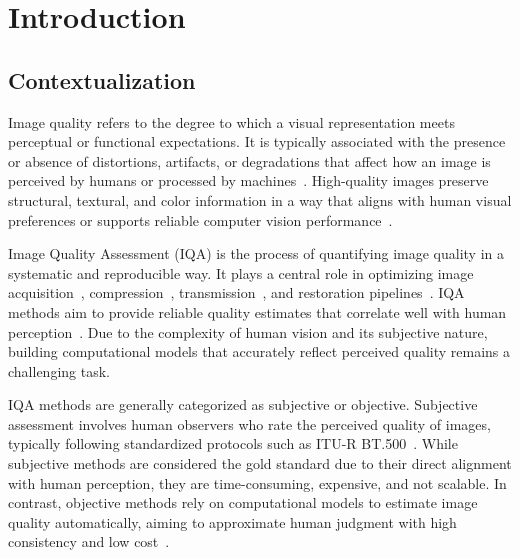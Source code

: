 \chapter{Introduction}\label{chap:introduction}

\section{Contextualization}\label{sec:contextualization}

Image quality refers to the degree to which a visual representation meets perceptual or functional expectations. It is typically associated with the presence or absence of distortions, artifacts, or degradations that affect how an image is perceived by humans or processed by machines~\cite{wang_bovik_modern_iqa_2006, thung_survey_iqa, ComprehensiveEvaluation2019}. High-quality images preserve structural, textural, and color information in a way that aligns with human visual preferences or supports reliable computer vision performance~\cite{sheikh_vif_2006, zhang_lpips_2018}.

Image Quality Assessment (IQA) is the process of quantifying image quality in a systematic and reproducible way. It plays a central role in optimizing image acquisition~\cite{ciancio_blur_assessment_2011}, compression~\cite{wang_no_reference_jpeg_2002}, transmission~\cite{engelke_wireless_iqa_2010}, and restoration pipelines~\cite{dabov_bm3d_2007}. IQA methods aim to provide reliable quality estimates that correlate well with human perception~\cite{wang_ssim_2004, FullReference2024}. Due to the complexity of human vision and its subjective nature, building computational models that accurately reflect perceived quality remains a challenging task.

IQA methods are generally categorized as subjective or objective. Subjective assessment involves human observers who rate the perceived quality of images, typically following standardized protocols such as ITU-R BT.500~\cite{itu_bt500_2023}. While subjective methods are considered the gold standard due to their direct alignment with human perception, they are time-consuming, expensive, and not scalable. In contrast, objective methods rely on computational models to estimate image quality automatically, aiming to approximate human judgment with high consistency and low cost~\cite{zaric_comparison_objective_subjective, sheikh_vif_2006}.

